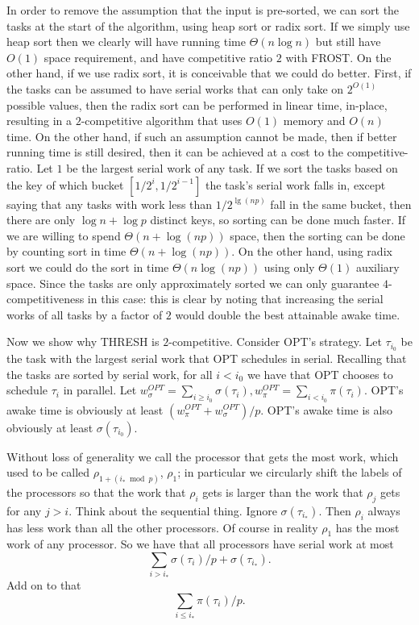 In order to remove the assumption that the input is pre-sorted,
we can sort the tasks at the start of the algorithm, using heap
sort or radix sort. If we simply use heap sort then we clearly
will have running time $\Theta(n \log n)$ but still have $O(1)$
space requirement, and have competitive ratio $2$ with FROST.
On the other hand, if we use radix sort, it is conceivable that
we could do better. First, if the tasks can be assumed to have
serial works that can only take on $2^{O(1)}$ possible values,
then the radix sort can be performed in linear time, in-place,
resulting in a $2$-competitive algorithm that uses $O(1)$ memory
and $O(n)$ time. On the other hand, if such an assumption cannot
be made, then if better running time is still desired, then it
can be achieved at a cost to the competitive-ratio. Let $1$ be
the largest serial work of any task. If we sort the tasks based
on the key of which bucket $[1/2^i, 1/2^{i-1}]$ the task's
serial work falls in, except saying
that any tasks with work less than $1/2^{\lg (np)}$ fall in the
same bucket, then there are only $\log n + \log p$ distinct keys,
so sorting can be done much faster. If we are willing to spend
$\Theta(n + \log (np))$ space, then the sorting can be done by
counting sort in time $\Theta(n+\log(np))$. On the other hand,
using radix sort we could do the sort in time $\Theta(n \log
(np))$ using only $\Theta(1)$ auxiliary space. 
Since the tasks are only approximately sorted we can only
guarantee $4$-competitiveness in this case: this is clear by
noting that increasing the serial works of all tasks by a factor
of $2$ would double the best attainable awake time.

Now we show why THRESH is $2$-competitive.
Consider OPT's strategy.
Let $\tau_{i_0}$ be the task with the largest serial work that
OPT schedules in serial. Recalling that the tasks are sorted by
serial work, for all $i < i_0$ we have that OPT chooses to
schedule $\tau_i$ in parallel. Let $w^{OPT}_\sigma = \sum_{i \ge
i_0} \sigma(\tau_i), w^{OPT}_\pi = \sum_{i < i_0} \pi(\tau_i)$.
OPT's awake time is obviously at least $(w^{OPT}_\pi +
w^{OPT}_\sigma)/p$. OPT's awake time is also obviously at least
$\sigma(\tau_{i_0})$.

Without loss of generality we call the processor that gets the
most work, which used to be called $\rho_{1+(i_* \bmod p)}$,
$\rho_1$; in particular we circularly shift the labels of the
processors so that the work that $\rho_i$ gets is larger than the
work that $\rho_j$ gets for any $j > i$.
Think about the sequential thing.
Ignore $\sigma(\tau_{i_*})$. Then $\rho_i$ always has less work
than all the other processors. Of course in reality $\rho_1$ has
the most work of any processor.
So we have that all processors have serial work at most 
$$\sum_{i > i_*} \sigma(\tau_i)/p + \sigma(\tau_{i_*}).$$
Add on to that $$\sum_{i \le i_*} \pi(\tau_i)/p.$$

